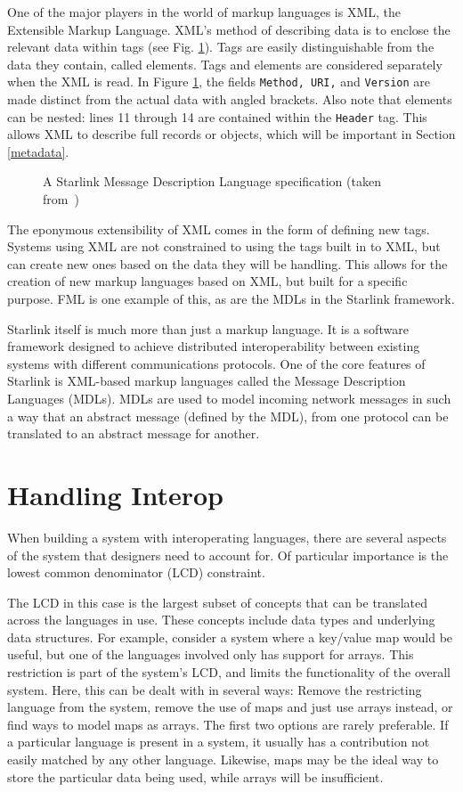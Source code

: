 \documentclass{sig-alternate}
\begin{document}
One of the major players in the world of markup languages is XML, the Extensible Markup Language. XML's method of describing data is to enclose the relevant data within tags (see Fig. \ref{MDL1}). Tags are easily distinguishable from the data they contain, called elements. Tags and elements are considered separately when the XML is read. In Figure \ref{MDL1}, the fields {\tt Method, URI,} and {\tt Version} are made distinct from the actual data with angled brackets.
Also note that elements can be nested: lines 11 through 14 are contained within the {\tt Header} tag. This allows XML to describe full records or objects, which will be important in Section \ref{metadata}.


\begin{figure}
\caption{A Starlink Message Description Language specification (taken from~\cite{Bromberg:2011})}
\label{MDL1}
\end{figure}


The eponymous extensibility of XML comes in the form of defining new tags. Systems using XML are not constrained to using the tags built in to XML, but can create new ones based on the data they will be handling. This allows for the creation of new markup languages based on XML, but built for a specific purpose. FML is one example of this, as are the MDLs in the Starlink framework.

Starlink itself is much more than just a markup language. It is a software framework designed to achieve distributed interoperability between existing systems with different communications protocols. One of the core features of Starlink is XML-based markup languages called the Message Description Languages (MDLs). MDLs are used to model incoming network messages in such a way that an abstract message (defined by the MDL), from one protocol can be translated to an abstract message for another.~\cite{Bromberg:2011}

\section{Handling Interop}\label{approaches}
When building a system with interoperating languages, there are several aspects of the system that designers need to account for. Of particular importance is the lowest common denominator (LCD) constraint.

The LCD in this case is the largest subset of concepts that can be translated across the languages in use. These concepts include data types and underlying data structures.
For example, consider a system where a key/value map would be useful, but one of the languages involved only has support for arrays. This restriction is part of the system's LCD, and limits the functionality of the overall system. Here, this can be dealt with in several ways: Remove the restricting language from the system, remove the use of maps and just use arrays instead, or find ways to model maps as arrays. The first two options are rarely preferable. If a particular language is present in a system, it usually has a contribution not easily matched by any other language. Likewise, maps may be the ideal way to store the particular data being used, while arrays will be insufficient.
\end{document}
